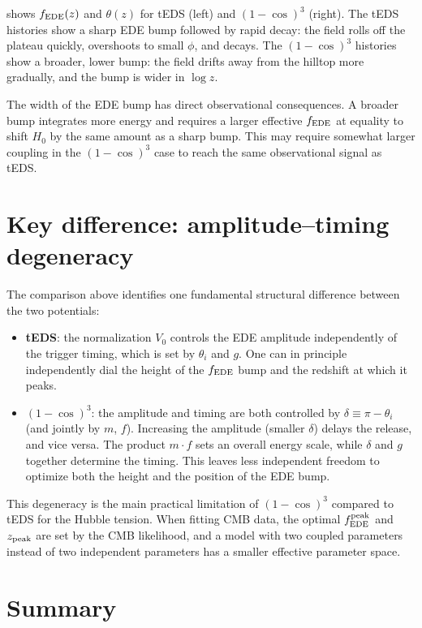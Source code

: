 \documentclass[aps,onecolumn,prd,nofootinbib,superscriptaddress,10pt,longbibliography,floatfix]{revtex4-2}
\newcommand{\fe}{f_{\rm EDE}}
\begin{document}
 shows $\fe(z)$ and $\theta(z)$ for tEDS (left) and $(1-\cos)^3$ (right). The tEDS histories show a sharp EDE bump followed by rapid decay: the field rolls off the plateau quickly, overshoots to small $\phi$, and decays. The $(1-\cos)^3$ histories show a broader, lower bump: the field drifts away from the hilltop more gradually, and the bump is wider in $\log z$.

The width of the EDE bump has direct observational consequences. A broader bump integrates more energy and requires a larger effective $\fe$ at equality to shift $H_0$ by the same amount as a sharp bump. This may require somewhat larger coupling in the $(1-\cos)^3$ case to reach the same observational signal as tEDS.

\section{Key difference: amplitude--timing degeneracy}
\label{sec:difference}

The comparison above identifies one fundamental structural difference between the two potentials:

\begin{itemize}
\item \textbf{tEDS}: the normalization $V_0$ controls the EDE amplitude independently of the trigger timing, which is set by $\theta_i$ and $g$. One can in principle independently dial the height of the $\fe$ bump and the redshift at which it peaks.

\item \textbf{$(1-\cos)^3$}: the amplitude and timing are both controlled by $\delta\equiv\pi-\theta_i$ (and jointly by $m$, $f$). Increasing the amplitude (smaller $\delta$) delays the release, and vice versa. The product $m\cdot f$ sets an overall energy scale, while $\delta$ and $g$ together determine the timing. This leaves less independent freedom to optimize both the height and the position of the EDE bump.
\end{itemize}

This degeneracy is the main practical limitation of $(1-\cos)^3$ compared to tEDS for the Hubble tension. When fitting CMB data, the optimal $\fe^{\rm peak}$ and $z_{\rm peak}$ are set by the CMB likelihood, and a model with two coupled parameters instead of two independent parameters has a smaller effective parameter space.

\section{Summary}
\label{sec:conclusions}
\end{document}
